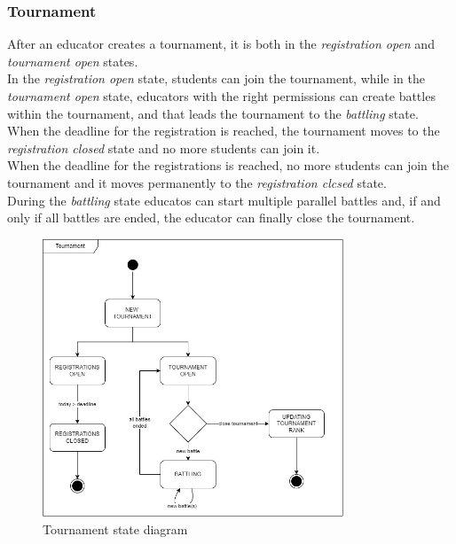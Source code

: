 \subsubsection*{Tournament}
After an educator creates a tournament, it is both in the \textit{registration open} and \textit{tournament open} states.\\
In the \textit{registration open} state, students can join the tournament, while in the \textit{tournament open} state, educators with the right permissions can create battles within the tournament, and that leads the tournament to the \textit{battling} state.\\
When the deadline for the registration is reached, the tournament moves to the \textit{registration closed} state and no more students can join it.\\
When the deadline for the registrations is reached, no more students can join the tournament and it moves permanently to the \textit{registration clcsed} state.\\
During the \textit{battling} state educatos can start multiple parallel battles and, if and only if all battles are ended, the educator can finally close the tournament.\\

\begin{figure}
    \centering
    \includegraphics[width=0.8\textwidth]{state_diagrams/tournament.jpg}
    \caption{Tournament state diagram}
\end{figure}

